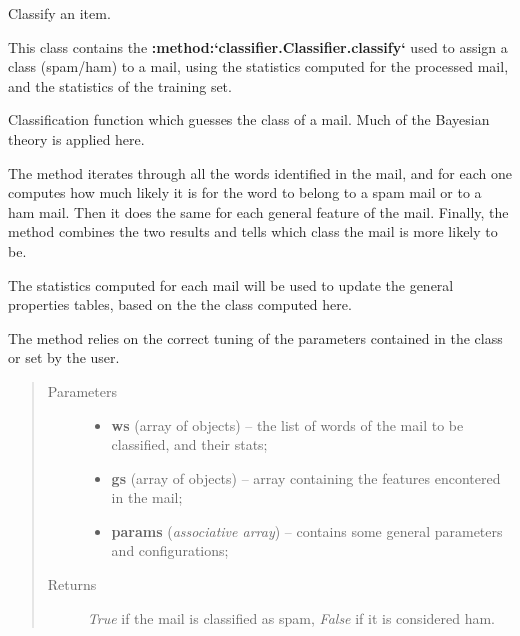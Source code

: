 \documentclass[letterpaper,10pt,english]{sphinxmanual}
\begin{document}
\begin{fulllineitems}
\label{index:classifier.Classifier}
Classify an item.

This class contains the {\color{red}\bfseries{}:method:{}`classifier.Classifier.classify{}`} used to
assign a class (spam/ham) to a mail, using the statistics computed
for the processed mail, and the statistics of the training set.

\begin{fulllineitems}
\label{index:classifier.Classifier.classify}
Classification function which guesses the class of a mail. Much of the
Bayesian theory is applied here.

The method iterates through all the words identified in the mail,
and for each one computes how much likely it is for the word to belong
to a spam mail or to a ham mail. Then it does the same for each general
feature of the mail. Finally, the method combines the two results
and tells which class the mail is more likely to be.

The statistics computed for each mail will be used to update the
general properties tables, based on the the class computed here.

The method relies on the correct tuning of the parameters contained in
the {\hyperref[index:config.Config]{}} class or set by the user.
\begin{quote}\begin{description}
\item[{Parameters}] \leavevmode\begin{itemize}
\item {} 
\textbf{ws} (array of {\hyperref[index:test_stat.Test_word]{}} objects) -- the list of words of the mail to be classified, and their stats;

\item {} 
\textbf{gs} (array of {\hyperref[index:test_stat.Test_stat]{}} objects) -- array containing the features encontered in the mail;

\item {} 
\textbf{params} (\emph{associative array}) -- contains some general parameters and configurations;

\end{itemize}

\item[{Returns}] \leavevmode
\emph{True} if the mail is classified as spam, \emph{False} if it is            considered ham.

\end{description}\end{quote}

\end{fulllineitems}


\end{fulllineitems}
\end{document}
